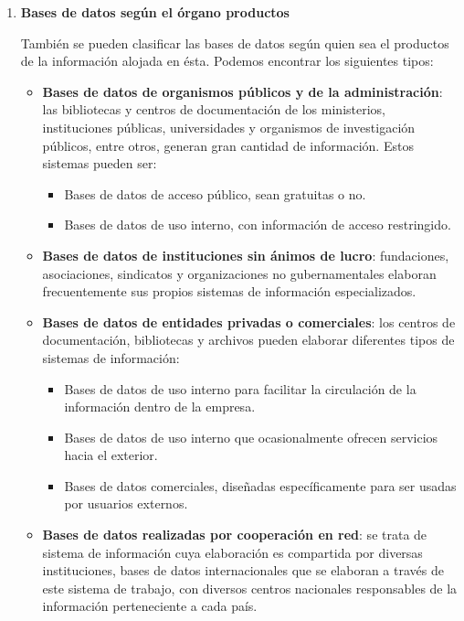 \begin{enumerate}[label=(\alph*)]
    \item \textbf{Bases de datos según el órgano productos}

    También se pueden clasificar las bases de datos según quien sea el productos de la información alojada en ésta. Podemos encontrar los siguientes tipos:

    \begin{itemize}
       \item \textbf{Bases de datos de organismos públicos y de la administración}: las bibliotecas y centros de documentación de los ministerios, instituciones públicas, universidades y organismos de investigación públicos, entre otros, generan gran cantidad de información. Estos sistemas pueden ser:

       \begin{itemize}
          \item Bases de datos de acceso público, sean gratuitas o no.
          \item Bases de datos de uso interno, con información de acceso restringido.
       \end{itemize}

       \item \textbf{Bases de datos de instituciones sin ánimos de lucro}: fundaciones, asociaciones, sindicatos y organizaciones no gubernamentales elaboran frecuentemente sus propios sistemas de información especializados.

       \item \textbf{Bases de datos de entidades privadas o comerciales}: los centros de documentación, bibliotecas y archivos pueden elaborar diferentes tipos de sistemas de información:
       \begin{itemize}
           \item Bases de datos de uso interno para facilitar la circulación de la información dentro de la empresa.
           \item Bases de datos de uso interno que ocasionalmente ofrecen servicios hacia el exterior.
           \item Bases de datos comerciales, diseñadas específicamente para ser usadas por usuarios externos.
       \end{itemize}

    \item \textbf{Bases de datos realizadas por cooperación en red}: se trata de sistema de información cuya elaboración es compartida por diversas instituciones, bases de datos internacionales que se elaboran a través de este sistema de trabajo, con diversos centros nacionales responsables de la información perteneciente a cada país.
    \end{itemize}


\end{enumerate}

